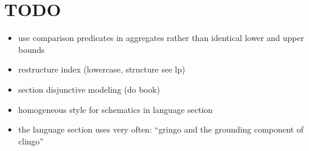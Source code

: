\section{TODO}
\begin{itemize}
\item use comparison predicates in aggregates rather than identical lower and upper bounds
\item restructure index (lowercase, structure see lp)
\item section disjunctive modeling (do book)
\item homogeneous style for schematics in language section
\item the language section uses very often: ``gringo and the grounding component of clingo''
  
\end{itemize}


